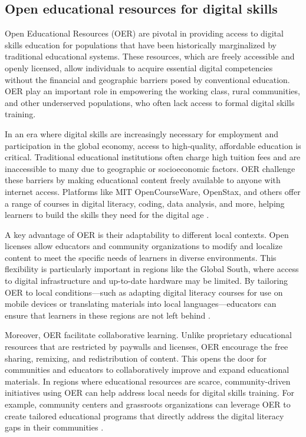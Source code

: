 \begin{refsection}
\subsection{Open educational resources for digital skills}

Open Educational Resources (OER) are pivotal in providing access to digital skills education for populations that have been historically marginalized by traditional educational systems. These resources, which are freely accessible and openly licensed, allow individuals to acquire essential digital competencies without the financial and geographic barriers posed by conventional education. OER play an important role in empowering the working class, rural communities, and other underserved populations, who often lack access to formal digital skills training.

In an era where digital skills are increasingly necessary for employment and participation in the global economy, access to high-quality, affordable education is critical. Traditional educational institutions often charge high tuition fees and are inaccessible to many due to geographic or socioeconomic factors. OER challenge these barriers by making educational content freely available to anyone with internet access. Platforms like MIT OpenCourseWare, OpenStax, and others offer a range of courses in digital literacy, coding, data analysis, and more, helping learners to build the skills they need for the digital age \cite[pp.~12-14]{fuchscriticalcommunication}. 

A key advantage of OER is their adaptability to different local contexts. Open licenses allow educators and community organizations to modify and localize content to meet the specific needs of learners in diverse environments. This flexibility is particularly important in regions like the Global South, where access to digital infrastructure and up-to-date hardware may be limited. By tailoring OER to local conditions—such as adapting digital literacy courses for use on mobile devices or translating materials into local languages—educators can ensure that learners in these regions are not left behind \cite[pp.~45-48]{eubanksautomating}. 

Moreover, OER facilitate collaborative learning. Unlike proprietary educational resources that are restricted by paywalls and licenses, OER encourage the free sharing, remixing, and redistribution of content. This opens the door for communities and educators to collaboratively improve and expand educational materials. In regions where educational resources are scarce, community-driven initiatives using OER can help address local needs for digital skills training. For example, community centers and grassroots organizations can leverage OER to create tailored educational programs that directly address the digital literacy gaps in their communities \cite[pp.~29-31]{fuchscriticalcommunication}.


\end{refsection}
